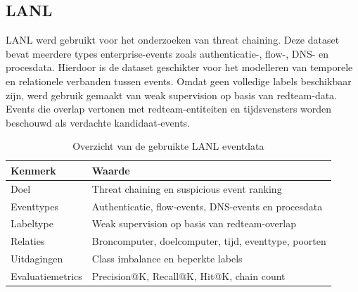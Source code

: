\subsection{LANL}

LANL werd gebruikt voor het onderzoeken van threat chaining.
\newline
\newline
Deze dataset bevat meerdere types enterprise-events zoals authenticatie-, flow-, DNS- en procesdata. Hierdoor is de dataset geschikter voor het modelleren van temporele en relationele verbanden tussen events.
\newline
\newline
Omdat geen volledige labels beschikbaar zijn, werd gebruik gemaakt van weak supervision op basis van redteam-data. Events die overlap vertonen met redteam-entiteiten en tijdsvensters worden beschouwd als verdachte kandidaat-events.

\begin{table}[H]
    \centering
    \caption{Overzicht van de gebruikte LANL eventdata}
    \label{tab:lanl_dataset}
    
    \begin{tabular}{p{4cm}p{7cm}}
        \toprule
        Kenmerk & Waarde \\
        \midrule
        
        Doel &
        Threat chaining en suspicious event ranking \\
        
        Eventtypes &
        Authenticatie, flow-events, DNS-events en procesdata \\
        
        Labeltype &
        Weak supervision op basis van redteam-overlap \\
        
        Relaties &
        Broncomputer, doelcomputer, tijd, eventtype, poorten \\
        
        Uitdagingen &
        Class imbalance en beperkte labels \\
        
        Evaluatiemetrics &
        Precision@K, Recall@K, Hit@K, chain count \\
        
        \bottomrule
    \end{tabular}
    
\end{table}

